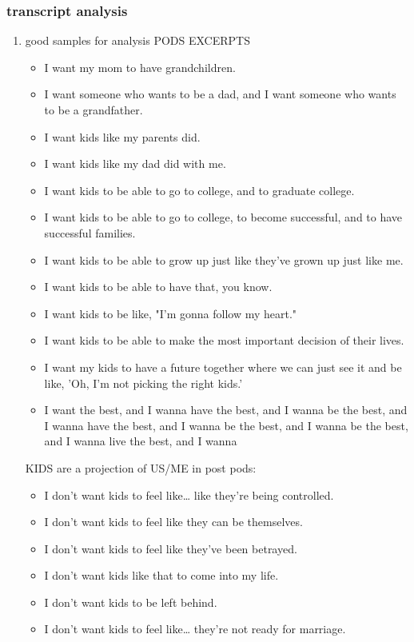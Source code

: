 \documentclass[11pt]{article}
\begin{document}
\subsubsection{transcript analysis}
\label{sec:org1591033}
\begin{enumerate}
\item good samples for analysis
\label{sec:org82a546b}
PODS EXCERPTS
\begin{itemize}
\item I want my mom to have grandchildren.
\item I want someone who wants to be a dad, and I want someone who wants
to be a grandfather.
\item I want kids like my parents did.
\item I want kids like my dad did with me.
\item I want kids to be able to go to college, and to graduate college.
\item I want kids to be able to go to college, to become successful, and to have successful families.
\item I want kids to be able to grow up just like they've grown up just like me.
\item I want kids to be able to have that, you know.
\item I want kids to be like, "I'm gonna follow my heart."
\item I want kids to be able to make the most important decision of their lives.
\item I want my kids to have a future together where we can just see it
and be like, 'Oh, I'm not picking the right kids.'
\item I want the best, and I wanna have the best, and I wanna be the
best, and I wanna have the best, and I wanna be the best, and I
wanna be the best, and I wanna live the best, and I wanna
\end{itemize}

KIDS are a projection of US/ME in post pods:
\begin{itemize}
\item I don't want kids to feel like\ldots{} like they're being controlled.
\item I don't want kids to feel like they can be themselves.
\item I don't want kids to feel like they've been betrayed.
\item I don't want kids like that to come into my life.
\item I don't want kids to be left behind.
\item I don't want kids to feel like\ldots{} they're not ready for marriage.
\end{itemize}



\end{enumerate}
\end{document}

